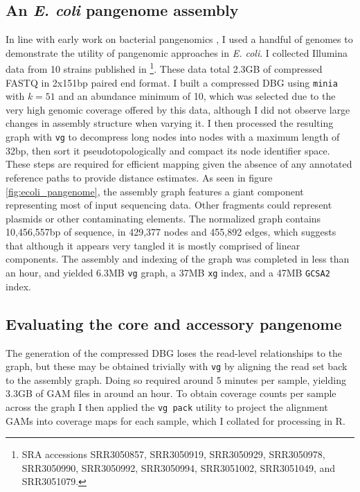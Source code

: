 \subsection{An \emph{E. coli} pangenome assembly}

In line with early work on bacterial pangenomics \cite{medini2005microbial}, I used a handful of genomes to demonstrate the utility of pangenomic approaches in \emph{E. coli}.
I collected Illumina data from 10 strains published in \cite{earle2016identifying}\footnote{SRA accessions SRR3050857, SRR3050919, SRR3050929, SRR3050978, SRR3050990, SRR3050992, SRR3050994, SRR3051002, SRR3051049, and SRR3051079.}.
These data total 2.3GB of compressed FASTQ in 2x151bp paired end format.
I built a compressed DBG using {\tt minia} with $k=51$ and an abundance minimum of 10, which was selected due to the very high genomic coverage offered by this data, although I did not observe large changes in assembly structure when varying it.
I then processed the resulting graph with {\tt vg} to decompress long nodes into nodes with a maximum length of 32bp, then sort it pseudotopologically and compact its node identifier space.
These steps are required for efficient mapping given the absence of any annotated reference paths to provide distance estimates.
As seen in figure \ref{fig:ecoli_pangenome}, the assembly graph features a giant component representing most of input sequencing data.
Other fragments could represent plasmids or other contaminating elements.
The normalized graph contains 10,456,557bp of sequence, in 429,377 nodes and 455,892 edges, which suggests that although it appears very tangled it is mostly comprised of linear components.
The assembly and indexing of the graph was completed in less than an hour, and yielded 6.3MB {\tt vg} graph, a 37MB {\tt xg} index, and a 47MB {\tt GCSA2} index.

\subsection{Evaluating the core and accessory pangenome}

The generation of the compressed DBG loses the read-level relationships to the graph, but these may be obtained trivially with {\tt vg} by aligning the read set back to the assembly graph.
Doing so required around 5 minutes per sample, yielding 3.3GB of GAM files in around an hour.
To obtain coverage counts per sample across the graph I then applied the {\tt vg pack} utility to project the alignment GAMs into coverage maps for each sample, which I collated for processing in R.


